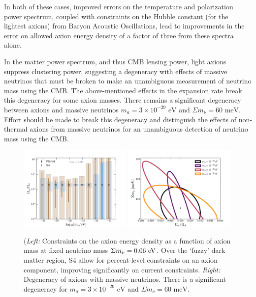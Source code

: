 In both of these cases, improved errors on the temperature and polarization power spectrum, coupled with constraints on the Hubble constant (for the lightest axions) from Baryon Acoustic Oscillations, lead to improvements in the error on allowed axion energy density of a factor of three from these spectra alone. 

In the matter power spectrum, and thus CMB lensing power, light axions suppress clustering power, suggesting a degeneracy with effects of massive neutrinos that must be broken to make an unambiguous measurement of neutrino mass using the CMB. The above-mentioned effects in the expansion rate break this degeneracy for some axion masses. There remains a significant degeneracy between axions and massive neutrinos $m_a=3\times 10^{-29}\text{ eV}$ and $\Sigma m_\nu=60\text{ meV}$. Effort should be made to break this degeneracy and distinguish the effects of non-thermal axions from massive neutrinos for an unambiguous detection of neutrino mass using the CMB. 

\begin{figure}[t] 
\begin{center} 
\includegraphics[width=0.49\textwidth]{DarkEnergy/Log_constraints_axions_s4.pdf}
\includegraphics[width=0.49\textwidth]{DarkEnergy/s4_frac_omnuh2.pdf}
\caption{(\textit{Left:} Constraints on the axion energy density as a function of axion mass at fixed neutrino mass $\Sigma m_\nu = 0.06~\rm{eV}$. Over the `fuzzy' dark matter region, S4 allow for percent-level constraints on an axion component, improving significantly on current constraints. \textit{Right:} Degeneracy of axions with massive neutrinos. There is a significant degeneracy for $m_a=3\times 10^{-29}\text{ eV}$ and $\Sigma m_\nu=60\text{ meV}$.
\label{fig:axions}}
\end{center}       
\end{figure}       

